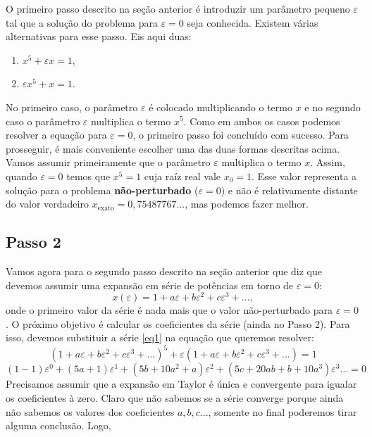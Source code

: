 \documentclass{article}
\begin{document}
O primeiro passo descrito na seção anterior é introduzir um parâmetro pequeno $\varepsilon$ tal que a solução do problema para $\varepsilon = 0$ seja conhecida. Existem várias alternativas para esse passo. Eis aqui duas:
\begin{enumerate}
    \item $x^5 + \varepsilon x = 1$,
    \item $\varepsilon x^5 + x = 1$.
\end{enumerate}
No primeiro caso, o parâmetro $\varepsilon$ é colocado multiplicando o termo $x$ e no segundo caso o parâmetro $\varepsilon$ multiplica o termo $x^5$. Como em ambos os casos podemos resolver a equação para $\varepsilon = 0$, o primeiro passo foi concluído com sucesso. Para prosseguir, é mais conveniente escolher uma das duas formas descritas acima. Vamos assumir primeiramente que o parâmetro $\varepsilon$ multiplica o termo $x$. Assim, quando $\varepsilon = 0$ temos que $x^5 = 1$ cuja raíz real vale $x_{0} = 1$. Esse valor representa a solução para o problema \textbf{não-perturbado} ($\varepsilon = 0$) e não é relativamente distante do valor verdadeiro $x_\text{exato} = 0,75487767...$, mas podemos fazer melhor. 

\subsection{Passo 2}

Vamos agora para o segundo passo descrito na seção anterior que diz que devemos assumir uma expansão em série de potências em torno de $\varepsilon = 0$:
\begin{equation}
    x(\varepsilon) = 1 + a\varepsilon + b\varepsilon^2 + c\varepsilon^3 + ...,
    \label{eq1}
\end{equation}
onde o primeiro valor da série é nada mais que o  valor não-perturbado para $\varepsilon = 0$. O próximo objetivo é calcular os coeficientes da série (ainda no Passo 2). Para isso, devemos substituir a série \eqref{eq1} na equação que queremos resolver:
\begin{equation}
    (1 + a\varepsilon + b\varepsilon^2 + c\varepsilon^3 + ...)^5 + \varepsilon(1 + a\varepsilon + b\varepsilon^2 + c\varepsilon^3 + ...)  = 1
\end{equation}
\begin{equation}
    (1-1)\varepsilon^{0} + (5a+1)\varepsilon^{1} + (5b+10a^2 + a)\varepsilon^2 + (5c + 20ab + b + 10a^3)\varepsilon^3 ... = 0
\end{equation}
Precisamos assumir que a expansão em Taylor é única e convergente para igualar os coeficientes à zero. Claro que não sabemos se a série converge porque ainda não sabemos os valores dos coeficientes $a,b,c...$, somente no final poderemos tirar alguma conclusão. Logo,
\end{document}
